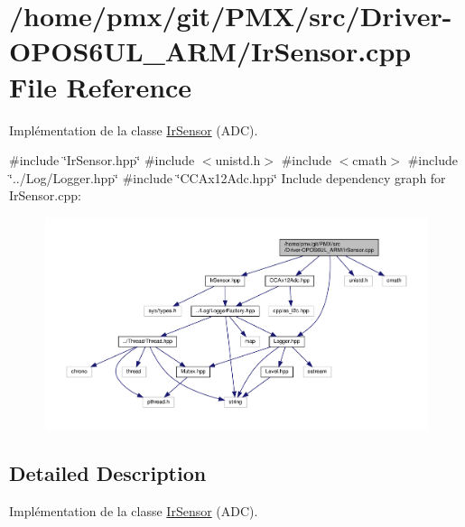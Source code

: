 \hypertarget{Driver-OPOS6UL__ARM_2IrSensor_8cpp}{}\section{/home/pmx/git/\+P\+M\+X/src/\+Driver-\/\+O\+P\+O\+S6\+U\+L\+\_\+\+A\+R\+M/\+Ir\+Sensor.cpp File Reference}
\label{Driver-OPOS6UL__ARM_2IrSensor_8cpp}


Implémentation de la classe \hyperlink{classIrSensor}{Ir\+Sensor} (A\+DC).  


{\ttfamily \#include \char`\"{}Ir\+Sensor.\+hpp\char`\"{}}\newline
{\ttfamily \#include $<$unistd.\+h$>$}\newline
{\ttfamily \#include $<$cmath$>$}\newline
{\ttfamily \#include \char`\"{}../\+Log/\+Logger.\+hpp\char`\"{}}\newline
{\ttfamily \#include \char`\"{}C\+C\+Ax12\+Adc.\+hpp\char`\"{}}\newline
Include dependency graph for Ir\+Sensor.\+cpp\+:
\nopagebreak
\begin{figure}[H]
\begin{center}
\leavevmode
\includegraphics[width=350pt]{Driver-OPOS6UL__ARM_2IrSensor_8cpp__incl}
\end{center}
\end{figure}


\subsection{Detailed Description}
Implémentation de la classe \hyperlink{classIrSensor}{Ir\+Sensor} (A\+DC). 

